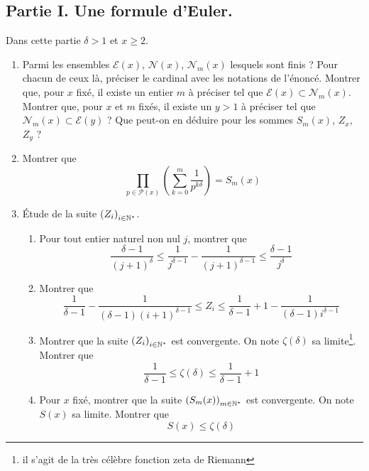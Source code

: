 \subsection*{Partie I. Une formule d'Euler.}
Dans cette partie $\delta>1$ et $x\geq 2$.
\begin{enumerate}
 \item Parmi les ensembles $\mathcal E(x)$, $\mathcal N(x)$, $\mathcal N_m(x)$ lesquels sont finis ? Pour chacun de ceux là, préciser le cardinal avec les notations de l'énoncé.\newline
Montrer que, pour $x$ fixé, il existe un entier $m$ à préciser tel que $\mathcal E(x)\subset \mathcal N_m(x)$.  Montrer que, pour $x$ et $m$ fixés, il existe un $y>1$ à préciser tel que $\mathcal N_m(x)\subset \mathcal E(y)$ ? Que peut-on en déduire pour les sommes $S_m(x)$, $Z_x$, $Z_y$ ?

\item Montrer que
\begin{displaymath}
 \prod_{p\in \mathcal P(x)}\left( \sum_{k=0}^{m}\frac{1}{p^{k\delta}}\right)  = S_m(x)
\end{displaymath}

\item \'Etude de la suite $\left( Z_i \right)_{i\in\mathbb{N}^*}$.
\begin{enumerate}
 \item Pour tout entier naturel non nul $j$, montrer que
\begin{displaymath}
 \frac{\delta -1}{(j+1)^\delta}\leq \frac{1}{j^{\delta -1}} - \frac{1}{(j+1)^{\delta -1}}\leq 
\frac{\delta -1}{j^\delta}
\end{displaymath}
\item Montrer que
\begin{displaymath}
 \frac{1}{\delta -1} - \frac{1}{(\delta -1)(i+1)^{\delta -1}}\leq Z_i
\leq \frac{1}{\delta -1} +1 - \frac{1}{(\delta -1)i^{\delta -1}}
\end{displaymath}
\item Montrer que la suite $\left( Z_i \right)_{i\in\mathbb{N}^*}$ est convergente. On note $\zeta(\delta)$ sa limite\footnote{il s'agit de la très célèbre fonction zeta de Riemann}. Montrer que
\begin{displaymath}
 \frac{1}{\delta -1} \leq \zeta(\delta) \leq \frac{1}{\delta -1} +1
\end{displaymath}
\item Pour $x$ fixé, montrer que la suite $\left(S_m(x) \right)_{m\in\mathbb{N}^*}$ est convergente. On note $S(x)$ sa limite. Montrer que
\begin{displaymath}
 S(x)\leq \zeta(\delta)
\end{displaymath}
\end{enumerate}


\end{enumerate}
